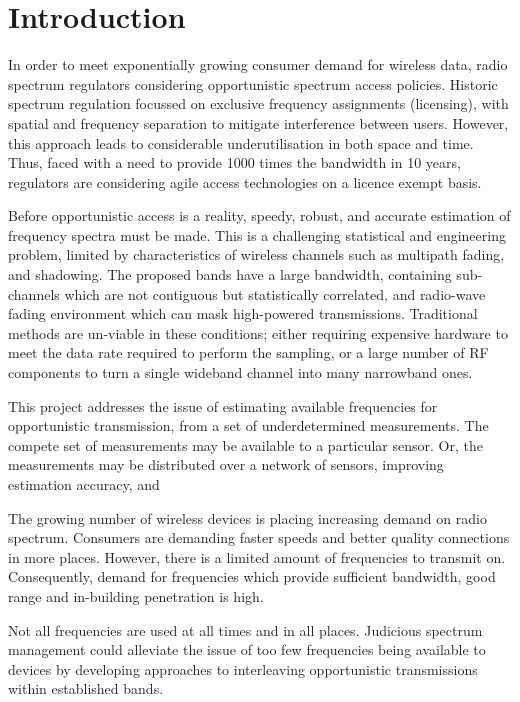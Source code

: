 \section{Introduction}

In order to meet exponentially growing consumer demand for wireless data, radio spectrum regulators considering opportunistic spectrum access policies. Historic spectrum regulation focussed on exclusive frequency assignments (licensing), with spatial and frequency separation to mitigate interference between users. However, this approach leads to considerable underutilisation in both space and time. Thus, faced with a need to provide 1000 times the bandwidth in 10 years, regulators are considering agile access technologies on a licence exempt basis.

Before opportunistic access is a reality, speedy, robust, and accurate estimation of frequency spectra must be made. This is a challenging statistical and engineering problem, limited by characteristics of wireless channels such as multipath fading, and shadowing. The proposed bands have a large bandwidth, containing sub-channels which are not contiguous but statistically correlated, and radio-wave fading environment which can mask high-powered transmissions. Traditional methods are un-viable in these conditions; either requiring expensive hardware to meet the data rate required to perform the sampling, or a large number of RF components to turn a single wideband channel into many narrowband ones.

This project addresses the issue of estimating available frequencies for opportunistic transmission, from a set of underdetermined measurements. The compete set of measurements may be available to a particular sensor. Or, the measurements may be distributed over a network of sensors, improving estimation accuracy, and 

The growing number of wireless devices is placing increasing demand on radio spectrum. Consumers are demanding faster speeds and better quality connections in more places. However, there is a limited amount of frequencies to transmit on. Consequently, demand for frequencies which provide sufficient bandwidth, good range and in-building penetration is high.

Not all frequencies are used at all times and in all places. Judicious spectrum management could alleviate the issue of too few frequencies being available to devices by developing approaches to interleaving opportunistic transmissions within established bands. 

